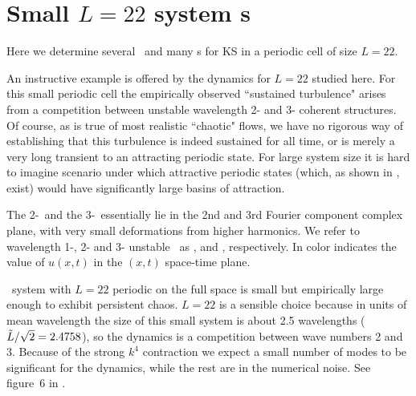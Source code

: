 %


\section{Small $L=22$ system {\rpo s}}
\label{s:L22}


Here we determine
several \eqva\ and many \rpo s for
KS in a periodic cell of size $L=22$.

An instructive 
example is offered by the dynamics for $L=22$ studied here.
For this small periodic cell
the empirically observed 
``sustained turbulence" arises from
a competition between unstable
wavelength 2- and 3- coherent structures.
Of course, as is true of most realistic ``chaotic"
flows, we have no rigorous way of establishing that 
this turbulence is indeed sustained for all time, 
or is merely a very long transient to an attracting
periodic state. For large system size 
it is hard to imagine scenario under which attractive
periodic states 
(which, as shown in , exist)
would have significantly large basins of attraction.


The 2-\eqv\  and the 3-\eqv\  essentially lie in
the 2nd and 3rd Fourier component complex plane, with very
small deformations from higher harmonics.
We refer to wavelength 1-, 2- and 3- unstable \eqva\ as
,  and ,
respectively.
In 
color indicates the value of $u(x,t)$ in 
the $(x,t)$ space-time plane.

\KS\ system with $L = 22$ periodic on the full space is small but
empirically large enough to exhibit persistent chaos.  $L=22$ is a
sensible choice because in units of mean wavelength the size of this
small system is about 2.5 wavelengths ($\tilde{L}/\sqrt{2}= 2.4758$),
so the dynamics is a competition between wave numbers 2 and 3.
Because of the strong $k^4$ contraction we expect a small
number of modes to be significant for the dynamics, while the
rest are in the numerical noise. See figure~6 in
.



